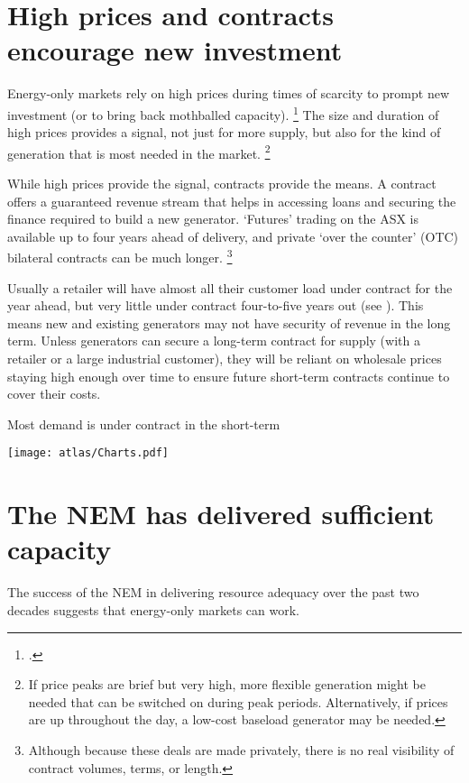 \documentclass[FrontPage]{grattan}
\begin{document}
\section{High prices and contracts encourage new investment}\label{sec:scarcity-pricing-encourages-new-investment}
Energy-only markets rely on high prices during times of scarcity to prompt new investment (or to bring back mothballed capacity).%
\footcite{hogan2005energy}
The size and duration of high prices provides a signal, not just for more supply, but also for the kind of generation that is most needed in the market.%
\footnote{\eg{} If price peaks are brief but very high, more flexible generation might be needed that can be switched on during peak periods. Alternatively, if prices are up throughout the day, a low-cost baseload generator may be needed.}

While high prices provide the signal, contracts provide the means. A contract offers a guaranteed revenue stream that helps in accessing loans and securing the finance required to build a new generator. `Futures' trading on the ASX is available up to four years ahead of delivery, and private `over the counter' (OTC) bilateral contracts can be much longer.%
\footnote{Although because these deals are made privately, there is no real visibility of contract volumes, terms, or length.} 

Usually a retailer will have almost all their customer load under contract for the year ahead, but very little under contract four-to-five years out (see ).
This means new and existing generators may not have security of revenue in the long term. Unless generators can secure a long-term contract for supply (with a retailer or a large industrial customer), they will be reliant on wholesale prices staying high enough over time to ensure future short-term contracts continue to cover their costs.

\begin{figureTop}
\caption{Most demand is under contract in the short-term}\label{fig:most-demand-is-under-contract}
\texttt{[image: atlas/Charts.pdf]}
\end{figureTop}

\section{The NEM has delivered sufficient capacity}\label{sec:the-NEM-has-delivered-investment-in-the-past}
The success of the NEM in delivering resource adequacy over the past two decades suggests that energy-only markets can work. 
\end{document}
